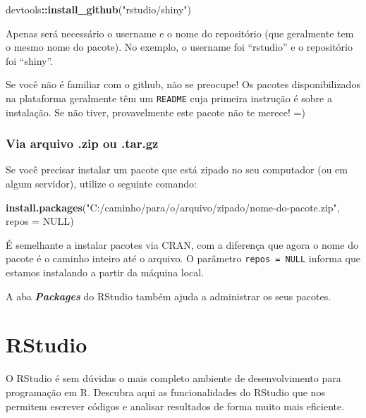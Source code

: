 \documentclass[]{book}
\newenvironment{Shaded}{\begin{snugshade}}{\end{snugshade}}
\newcommand{\DataTypeTok}[1]{\textcolor[rgb]{0.13,0.29,0.53}{#1}}
\newcommand{\KeywordTok}[1]{\textcolor[rgb]{0.13,0.29,0.53}{\textbf{#1}}}
\newcommand{\NormalTok}[1]{#1}
\newcommand{\OperatorTok}[1]{\textcolor[rgb]{0.81,0.36,0.00}{\textbf{#1}}}
\newcommand{\OtherTok}[1]{\textcolor[rgb]{0.56,0.35,0.01}{#1}}
\newcommand{\StringTok}[1]{\textcolor[rgb]{0.31,0.60,0.02}{#1}}
\begin{document}
\begin{Shaded}
\begin{Highlighting}[]
\NormalTok{devtools}\OperatorTok{::}\KeywordTok{install_github}\NormalTok{(}\StringTok{"rstudio/shiny"}\NormalTok{)}
\end{Highlighting}
\end{Shaded}

Apenas será necessário o username e o nome do repositório (que geralmente tem o mesmo nome do pacote). No exemplo, o username foi ``rstudio'' e o repositório foi ``shiny''.

Se você não é familiar com o github, não se preocupe! Os pacotes disponibilizados na plataforma geralmente têm um \texttt{README} cuja primeira instrução é sobre a instalação. Se não tiver, provavelmente este pacote não te merece! =)

\hypertarget{via-arquivo-.zip-ou-.tar.gz}{%
\subsection{Via arquivo .zip ou .tar.gz}\label{via-arquivo-.zip-ou-.tar.gz}}

Se você precisar instalar um pacote que está zipado no seu computador (ou em algum servidor), utilize o seguinte comando:

\begin{Shaded}
\begin{Highlighting}[]
\KeywordTok{install.packages}\NormalTok{(}\StringTok{"C:/caminho/para/o/arquivo/zipado/nome-do-pacote.zip"}\NormalTok{, }\DataTypeTok{repos =} \OtherTok{NULL}\NormalTok{)}
\end{Highlighting}
\end{Shaded}

É semelhante a instalar pacotes via CRAN, com a diferença que agora o nome do pacote é o caminho inteiro até o arquivo. O parâmetro \texttt{repos\ =\ NULL} informa que estamos instalando a partir da máquina local.

A aba \textbf{\emph{Packages}} do RStudio também ajuda a administrar os seus pacotes.

\hypertarget{rstudio}{%
\chapter{RStudio}\label{rstudio}}

O RStudio é sem dúvidas o mais completo ambiente de desenvolvimento para programação em R. Descubra aqui as funcionalidades do RStudio que nos permitem escrever códigos e analisar resultados de forma muito mais eficiente.
\end{document}
